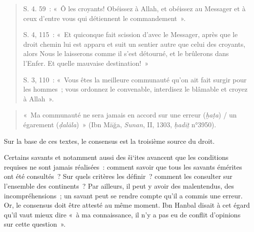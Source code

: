 \begin{quote}
    

S. 4. 59~: «~Ô les croyants! Obéissez à Allah, et obéissez au Messager
et à ceux d'entre vous qui détiennent le commandement~».

S. 4, 115~: «~Et quiconque fait scission d'avec le Messager, après que
le droit chemin lui est apparu et suit un sentier autre que celui des
croyants, alors Nous le laisserons comme il s'est détourné, et le
brûlerons dans l'Enfer. Et quelle mauvaise destination!~»

S. 3, 110~: «~Vous êtes la meilleure communauté qu'on ait fait surgir
pour les hommes~; vous ordonnez le convenable, interdisez le blâmable et
croyez à Allah~».
\end{quote}
\begin{quote}
    

«~Ma communauté ne sera jamais en accord sur une erreur (\emph{ḫaṭa}) /
un égarement (\emph{ḍalāla})~» (Ibn Māğa, \emph{Sunan}, II, 1303,
\emph{ḥadīṯ} n°3950).
\end{quote}
Sur la base de ces textes, le consensus est la troisième source du
droit.


Certains savants et notamment aussi des ši`ites avancent que les
conditions requises ne sont jamais réalisées~: comment savoir que tous
les savants émérites ont été consultés~? Sur quels critères les
définir~? comment les consulter sur l'ensemble des continents~? Par
ailleurs, il peut y avoir des malentendus, des incompréhensions~; un
savant peut se rendre compte qu'il a commis une erreur. Or, le consensus
doit être attesté au même moment. Ibn Hanbal disait à cet égard qu'il
vaut mieux dire «~à ma connaissance, il n'y a pas eu de conflit
d'opinions sur cette question~».


